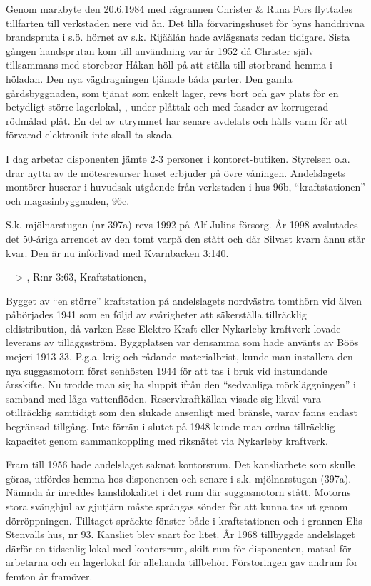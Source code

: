 Genom markbyte den 20.6.1984 med rågrannen Christer \& Runa Fors flyttades tillfarten till verkstaden nere vid ån. Det lilla förvaringshuset för byns handdrivna brandspruta i s.ö. hörnet av s.k. Rijäälån hade avlägsnats redan tidigare. Sista gången handsprutan kom till användning var år 1952 då Christer själv tillsammans med storebror Håkan höll på att ställa till storbrand hemma i höladan. Den nya vägdragningen tjänade båda parter. Den gamla gårdsbyggnaden, som tjänat som enkelt lager, revs bort och gav plats för en betydligt större lagerlokal, , under plåttak och med fasader av korrugerad rödmålad plåt. En del av utrymmet har senare avdelats och hålls varm för att förvarad elektronik inte skall ta skada.

I dag arbetar disponenten jämte 2-3 personer i kontoret-butiken. Styrelsen o.a. drar nytta av de mötesresurser huset erbjuder på övre 	våningen. Andelslagets montörer huserar i huvudsak utgående från verkstaden i hus 96b, ``kraftstationen'' och magasinbyggnaden, 96c.

S.k. mjölnarstugan (nr 397a) revs 1992 på Alf Julins försorg. År 1998 avslutades det 50-åriga arrendet av den tomt varpå den stått och där Silvast kvarn ännu står kvar. Den är nu införlivad med Kvarnbacken 3:140.


---> , R:nr 3:63,	Kraftstationen, 

Bygget av ``en större'' kraftstation på andelslagets nordvästra tomthörn vid älven påbörjades 1941 som en följd av svårigheter att 	säkerställa tillräcklig eldistribution, då varken Esse Elektro Kraft eller Nykarleby kraftverk lovade leverans av tilläggsström. Byggplatsen var densamma som hade använts av Böös mejeri 1913-33. P.g.a. krig och rådande materialbrist, kunde man installera den nya suggasmotorn först senhösten 1944 för att tas i bruk vid instundande årsskifte. Nu trodde man sig ha sluppit ifrån den ``sedvanliga mörkläggningen'' i samband med låga vattenflöden. Reservkraftkällan visade sig likväl vara otillräcklig samtidigt som den slukade ansenligt med bränsle, varav fanns endast begränsad tillgång. Inte förrän i slutet på 1948 kunde man ordna tillräcklig kapacitet genom sammankoppling med riksnätet via Nykarleby kraftverk.


Fram till 1956 hade andelslaget saknat kontorsrum. Det kansliarbete som skulle göras, utfördes hemma hos disponenten och senare i s.k. mjölnarstugan (397a). Nämnda år inreddes kanslilokalitet i det rum där suggasmotorn stått. Motorns stora svänghjul av gjutjärn måste sprängas sönder för att kunna tas ut genom dörröppningen. Tilltaget spräckte fönster både i kraftstationen och i grannen Elis Stenvalls hus, nr 93. Kansliet blev snart för litet. År 1968 tillbyggde andelslaget därför en tidsenlig lokal med kontorsrum, skilt rum för disponenten, matsal för arbetarna och en lagerlokal för allehanda tillbehör. Förstoringen gav andrum för femton år framöver.

